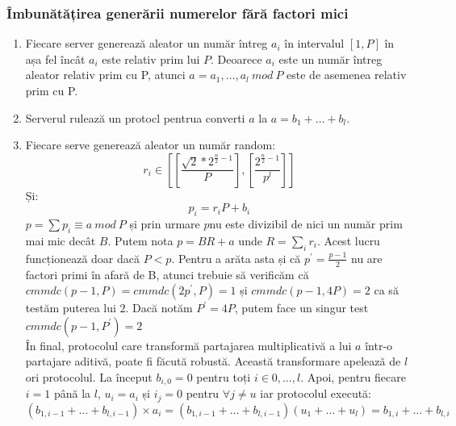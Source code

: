 \documentclass[12]{report}
\begin{document}
\subsubsection{Îmbunătățirea generării numerelor fără factori mici}
\begin{enumerate}
\item Fiecare server generează aleator un număr întreg $a_i$ în intervalul $[1,P]$ în așa fel încât $a_i$ este relativ prim lui $P$. Deoarece $a_i$ este un număr întreg aleator relativ prim cu P, atunci $a=a_1, \dots ,a_l \ mod \ P$ este de asemenea relativ prim cu P.

\item Serverul rulează un protocl pentrua converti $a$ la $a=b_1+ \dots +b_l$.

\item Fiecare serve generează aleator un număr random:
$$r_i \in \left[  [ \frac{\sqrt{2}* 2^{\frac{n}{2} -1} }{P}   ], [\frac{2^{\frac{n}{2}-1}}{p^l}]      \right] $$
Și:
$$ p_i=r_i P + b_i$$
$p = \sum p_i \equiv a \ mod \ P$ și prin urmare $p$nu este divizibil de nici un număr prim mai mic decât $B$. Putem nota $p=BR +a$ unde $R=\sum_{i} r_i$. Acest lucru funcționează doar dacă $P<p$. Pentru a arăta asta și că $p^{'} = \frac{p-1}{2}$ nu are factori primi în afară de B, atunci trebuie să verificăm că $cmmdc(p-1,P)=cmmdc(2p^{'},P)=1$ și $cmmdc(p-1,4P)=2$ ca să testăm puterea lui 2. Dacă notăm $P^{'}=4P$, putem face un singur test $cmmdc(p-1,P^{'})=2$\\
În final, protocolul care transformă partajarea multiplicativă a lui $a$ într-o partajare aditivă, poate fi făcută robustă. Această transformare apelează de $l$ ori protocolul. La început $b_{i,0}=0$ pentru toți $i \in {0, \dots ,l}$. Apoi, pentru fiecare $i=1$ până la $l$, $u_i=a_i$ și $i_j=0$ pentru $\forall j \neq u$ iar protocolul execută: 
$$(b_{1,i-1}+ \dots +b_{l,i-1}) \times a_i = (b_{1,i-1}+ \dots +b_{l,i-1})(u_1+ \dots +u_l)=b_{1,i}+ \dots +b_{l,i}$$
\end{enumerate}
\end{document}
